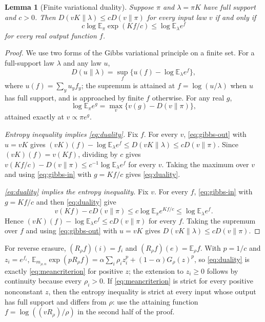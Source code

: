 \documentclass[11pt,a4paper]{article}
\numberwithin{equation}{section}
\newtheorem{lemma}[theorem]{Lemma}
\theoremstyle{definition}
\theoremstyle{remark}
\newcommand{\KL}{D}
\newcommand{\E}{\mathbb E}
\newcommand{\mra}{m_{\rho,\alpha}}
\begin{document}
\begin{lemma}[Finite variational duality]\label{lem:duality}
Suppose \(\pi\) and \(\lambda=\pi K\) have full support and \(c>0\). Then
\(\KL(vK\|\lambda)\le c\KL(v\|\pi)\) for every input law \(v\) if and only if
\begin{equation}\label{eq:duality}
c\log\E_\pi\exp(Kf/c)\le\log\E_\lambda e^f
\end{equation}
for every real output function \(f\).
\end{lemma}
\begin{proof}
We use two forms of the Gibbs variational principle on a finite set. For a
full-support law \(\lambda\) and any law \(u\),
\begin{equation}\label{eq:gibbs-out}
\KL(u\|\lambda)=\sup_f\{u(f)-\log\E_\lambda e^f\},
\end{equation}
where \(u(f)=\sum_y u_yf_y\); the supremum is attained at
\(f=\log(u/\lambda)\) when \(u\) has full support, and is approached by
finite \(f\) otherwise. For any real \(g\),
\begin{equation}\label{eq:gibbs-in}
\log\E_\pi e^{g}=\max_v\{v(g)-\KL(v\|\pi)\},
\end{equation}
attained exactly at \(v\propto\pi e^{g}\).

\emph{Entropy inequality implies \eqref{eq:duality}.} Fix \(f\). For every
\(v\), \eqref{eq:gibbs-out} with \(u=vK\) gives
\((vK)(f)-\log\E_\lambda e^f\le\KL(vK\|\lambda)\le c\KL(v\|\pi)\). Since
\((vK)(f)=v(Kf)\), dividing by \(c\) gives
\(v(Kf/c)-\KL(v\|\pi)\le c^{-1}\log\E_\lambda e^f\) for every \(v\).
Taking the maximum over \(v\) and using \eqref{eq:gibbs-in} with
\(g=Kf/c\) gives \eqref{eq:duality}.

\emph{\eqref{eq:duality} implies the entropy inequality.} Fix \(v\). For
every \(f\), \eqref{eq:gibbs-in} with \(g=Kf/c\) and then
\eqref{eq:duality} give
\[
v(Kf)-c\KL(v\|\pi)\le c\log\E_\pi e^{Kf/c}\le\log\E_\lambda e^f .
\]
Hence \((vK)(f)-\log\E_\lambda e^f\le c\KL(v\|\pi)\) for every \(f\).
Taking the supremum over \(f\) and using \eqref{eq:gibbs-out} with
\(u=vK\) gives \(\KL(vK\|\lambda)\le c\KL(v\|\pi)\).
\end{proof}

For reverse erasure, \((R_\rho f)(i)=f_i\) and
\((R_\rho f)(e)=\E_\rho f\). With \(p=1/c\) and \(z_i=e^{f_i}\),
\(\E_{\mra}\exp(pR_\rho f)=\alpha\sum_i\rho_iz_i^p+(1-\alpha)G_\rho(z)^p\),
so \eqref{eq:duality} is exactly \eqref{eq:meancriterion} for positive
\(z\); the extension to \(z_i\ge0\) follows by continuity because every
\(\rho_i>0\). If \eqref{eq:meancriterion} is strict for every positive
nonconstant \(z\), then the entropy inequality is strict at every input
whose output has full support and differs from \(\rho\): use the attaining
function \(f=\log((vR_\rho)/\rho)\) in the second half of the proof.
\end{document}
